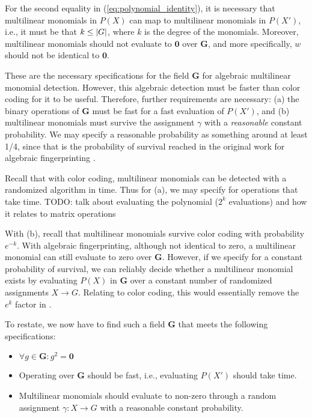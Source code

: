For the second equality in (\ref{eq:polynomial_identity}), it is necessary that multilinear 
monomials in $P(X)$ can map to multilinear monomials in $P(X')$, i.e., it must be that 
$k \leq {\left\vert G\right\vert}$, where $k$ is the degree of the monomials. 
Moreover, multilinear monomials 
should not evaluate to $\mathbf{0}$ over $\mathbf{G}$, and more specifically, 
$w$ should not be identical to $\mathbf{0}$.

These are the necessary specifications for the field $\mathbf{G}$ for algebraic multilinear monomial detection. 
However, this algebraic detection must be faster than color coding for it to be useful. 
Therefore, further requirements are necessary: (a) the binary operations of $\mathbf{G}$ 
must be fast for a fast evaluation of $P(X')$, and (b) multilinear monomials must 
survive the assignment $\gamma$ with a \emph{reasonable} constant probability. 
We may specify a reasonable probability as something around at least 1/4, since that is 
the probability of survival reached in the original work for algebraic fingerprinting \cite{Koutis08}.

Recall that with color coding, multilinear monomials can be detected with a 
randomized algorithm in  time. Thus for (a), we may specify for 
operations that take  time. TODO: talk about evaluating the polynomial ($2^k$ evaluations) 
and how it relates to matrix operations

With (b), recall that multilinear monomials 
survive color coding with probability $e^{-k}$. 
With algebraic fingerprinting, although not identical to zero, a multilinear monomial 
can still evaluate to zero over $\mathbf{G}$. 
However, if we specify for a constant 
probability of survival, we can reliably decide whether a multilinear monomial exists 
by evaluating $P(X)$ in $\mathbf{G}$ over a constant number of 
randomized assignments $X \to G$. Relating to color coding, 
this would essentially remove the 
$e^k$ factor in .

To restate, we now have to find such a field $\mathbf{G}$ that 
meets the following specifications: 
\begin{itemize}
  \item $\forall g \in \mathbf{G} \colon g^2 = \mathbf{0}$
  \item Operating over $\mathbf{G}$ should be fast, i.e., evaluating 
  $P(X')$ should take  time.
  \item Multilinear monomials should evaluate to non-zero
  through a random assignment 
  $\gamma \colon X \to G$ with a reasonable constant probability.
\end{itemize}

